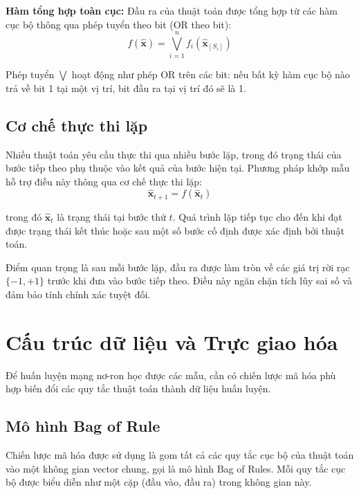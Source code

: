 \vspace{0.2cm}

\textbf{Hàm tổng hợp toàn cục:} Đầu ra của thuật toán được tổng hợp từ các hàm cục bộ thông qua phép tuyển theo bit (OR theo bit):
\begin{equation}
    f(\hat{\mathbf{x}}) = \bigvee_{i=1}^{n} f_i(\hat{\mathbf{x}}_{[S_i]})
\end{equation}

Phép tuyển $\bigvee$ hoạt động như phép OR trên các bit: nếu bất kỳ hàm cục bộ nào trả về bit 1 tại một vị trí, bit đầu ra tại vị trí đó sẽ là 1.

\subsection{Cơ chế thực thi lặp}

Nhiều thuật toán yêu cầu thực thi qua nhiều bước lặp, trong đó trạng thái của bước tiếp theo phụ thuộc vào kết quả của bước hiện tại. Phương pháp khớp mẫu hỗ trợ điều này thông qua cơ chế thực thi lặp:
\begin{equation}
    \hat{\mathbf{x}}_{t+1} = f(\hat{\mathbf{x}}_t)
\end{equation}

trong đó $\hat{\mathbf{x}}_t$ là trạng thái tại bước thứ $t$. Quá trình lặp tiếp tục cho đến khi đạt được trạng thái kết thúc hoặc sau một số bước cố định được xác định bởi thuật toán.

Điểm quan trọng là sau mỗi bước lặp, đầu ra được làm tròn về các giá trị rời rạc $\{-1, +1\}$ trước khi đưa vào bước tiếp theo. Điều này ngăn chặn tích lũy sai số và đảm bảo tính chính xác tuyệt đối.

\section{Cấu trúc dữ liệu và Trực giao hóa}

Để huấn luyện mạng nơ-ron học được các mẫu, cần có chiến lược mã hóa phù hợp biến đổi các quy tắc thuật toán thành dữ liệu huấn luyện.

\subsection{Mô hình Bag of Rule}

Chiến lược mã hóa được sử dụng là gom tất cả các quy tắc cục bộ của thuật toán vào một không gian vector chung, gọi là mô hình Bag of Rules. Mỗi quy tắc cục bộ được biểu diễn như một cặp (đầu vào, đầu ra) trong không gian này.

